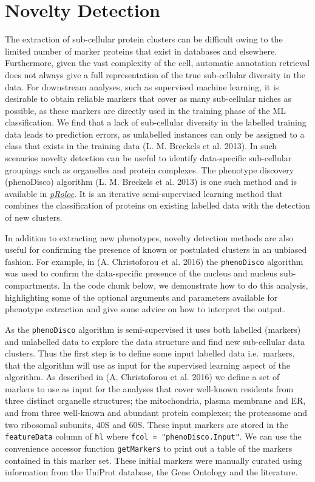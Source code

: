 \section{Novelty Detection}\label{novelty-detection}

The extraction of sub-cellular protein clusters can be difficult owing
to the limited number of marker proteins that exist in databases and
elsewhere. Furthermore, given the vast complexity of the cell, automatic
annotation retrieval does not always give a full representation of the
true sub-cellular diversity in the data. For downstream analyses, such
as supervised machine learning, it is desirable to obtain reliable
markers that cover as many sub-cellular niches as possible, as these
markers are directly used in the training phase of the ML
classification. We find that a lack of sub-cellular diversity in the
labelled training data leads to prediction errors, as unlabelled
instances can only be assigned to a class that exists in the training
data (L. M. Breckels et al. 2013). In such scenarios novelty detection
can be useful to identify data-specific sub-cellular groupings such as
organelles and protein complexes. The phenotype discovery (phenoDisco)
algorithm (L. M. Breckels et al. 2013) is one such method and is
available in
\emph{\href{http://bioconductor.org/packages/pRoloc}{pRoloc}}. It is an
iterative semi-supervised learning method that combines the
classification of proteins on existing labelled data with the detection
of new clusters.

In addition to extracting new phenotypes, novelty detection methods are
also useful for confirming the presence of known or postulated clusters
in an unbiased fashion. For example, in (A. Christoforou et al. 2016)
the \texttt{phenoDisco} algorithm was used to confirm the data-specific
presence of the nucleus and nucleus sub-compartments. In the code chunk
below, we demonstrate how to do this analysis, highlighting some of the
optional arguments and parameters available for phenotype extraction and
give some advice on how to interpret the output.

As the \texttt{phenoDisco} algorithm is semi-supervised it uses both
labelled (markers) and unlabelled data to explore the data structure and
find new sub-cellular data clusters. Thus the first step is to define
some input labelled data i.e.~markers, that the algorithm will use as
input for the supervised learning aspect of the algorithm. As described
in (A. Christoforou et al. 2016) we define a set of markers to use as
input for the analyses that cover well-known residents from three
distinct organelle structures; the mitochondria, plasma membrane and ER,
and from three well-known and abundant protein complexes; the proteasome
and two ribosomal subunits, 40S and 60S. These input markers are stored
in the \texttt{featureData} column of \texttt{hl} where
\texttt{fcol = "phenoDisco.Input"}. We can use the convenience accessor
function \texttt{getMarkers} to print out a table of the markers
contained in this marker set. These initial markers were manually
curated using information from the UniProt database, the Gene Ontology
and the literature.

